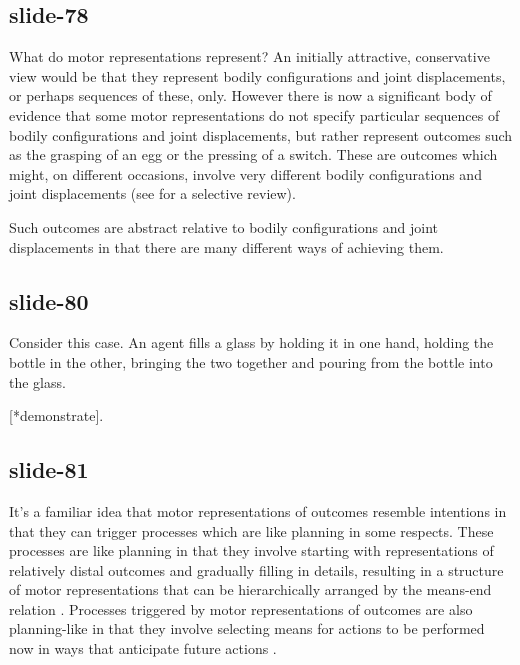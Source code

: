 \documentclass[12pt,\papersize]{extarticle}
\begin{document}
\subsection{slide-78}
What do motor representations represent? An initially attractive, conservative
view would be that they represent bodily configurations and joint displacements,
or perhaps sequences of these, only.
However there is now a significant body of evidence that some motor representations
do not specify particular sequences of bodily configurations and joint displacements,
but rather represent outcomes such as the grasping of an egg or the pressing of a switch.
These are outcomes which might, on different occasions, involve very different bodily
configurations and joint displacements
(see \citealp{rizzolatti_functional_2010} for a selective review).

Such outcomes are abstract relative to bodily configurations and joint displacements
in that there are many different ways of achieving them.


\subsection{slide-80}
Consider this case.
An agent fills a glass by holding it in one hand, holding the bottle in the other,
bringing the two together and pouring from the bottle into the glass.

[*demonstrate].

\subsection{slide-81}
It’s a familiar idea that motor representations of outcomes resemble intentions in that they can
trigger processes which are like planning in some respects.
These processes are like planning in that they involve starting with representations of relatively
distal outcomes and gradually filling in details, resulting in a structure of motor representations
that can be hierarchically arranged by the means-end relation \citep{bekkering:2000_imitation,
grafton:2007_evidence}.
Processes triggered by motor representations of outcomes are also planning-like in that they
involve selecting means for actions to be performed now in ways that anticipate future actions
\citep{jeannerod_motor_2006,zhang:2007_planning,rosenbaum:2012_cognition}.
\end{document}

